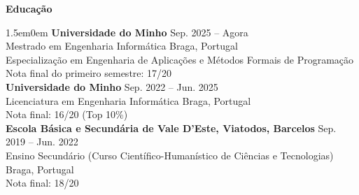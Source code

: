\noindent\textbf{Educação}
\noindent\hrulefill
\vspace{0.25em}
\begin{adjustwidth}{1.5em}{0em}
\textbf{Universidade do Minho} \hfill Sep. 2025 -- Agora \\
Mestrado em Engenharia Informática \hfill Braga, Portugal \\
Especialização em Engenharia de Aplicações e Métodos Formais de Programação \\
Nota final do primeiro semestre: 17/20
\vspace{0.5em}
\\
\textbf{Universidade do Minho} \hfill Sep. 2022 -- Jun. 2025 \\
Licenciatura em Engenharia Informática \hfill Braga, Portugal \\
Nota final: 16/20 (Top 10\%)
\vspace{0.5em}
\\
\textbf{Escola Básica e Secundária de Vale D’Este, Viatodos, Barcelos} \hfill Sep. 2019 -- Jun. 2022 \\
Ensino Secundário (Curso Científico-Humanístico de Ciências e Tecnologias) \hfill Braga, Portugal \\
Nota final: 18/20
\end{adjustwidth}
\vspace{0.25em}